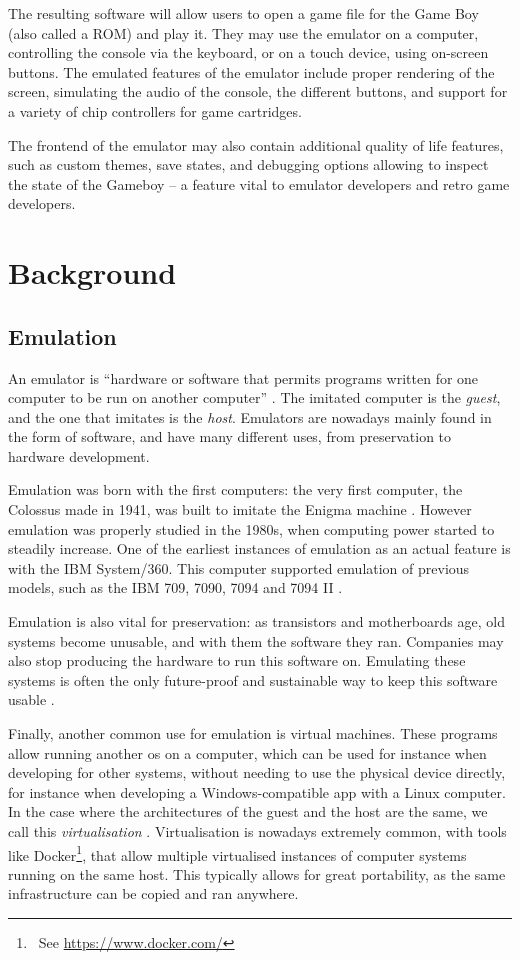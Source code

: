\documentclass[11pt]{informatics-report}
\newcommand{\ftnt}[1]{\footnote{~See \url{#1}}}
\begin{document}
The resulting software will allow users to open a game file for the Game Boy (also called a ROM) and play it. They may use the emulator on a computer, controlling the console via the keyboard, or on a touch device, using on-screen buttons. The emulated features of the emulator include proper rendering of the screen, simulating the audio of the console, the different buttons, and support for a variety of chip controllers for game cartridges.

The frontend of the emulator may also contain additional quality of life features, such as custom themes, save states, and debugging options allowing to inspect the state of the Gameboy -- a feature vital to emulator developers and retro game developers.

\chapter{Background}

\section{Emulation}

An emulator is ``hardware or software that permits programs written for one computer to be run on another computer'' \cite{emulator_def}. The imitated computer is the \textit{guest}, and the one that imitates is the \textit{host}. Emulators are nowadays mainly found in the form of software, and have many different uses, from preservation to hardware development.

Emulation was born with the first computers: the very first computer, the Colossus made in 1941, was built to imitate the Enigma machine \cite{emulator_origin}. However emulation was properly studied in the 1980s, when computing power started to steadily increase. One of the earliest instances of emulation as an actual feature is with the IBM System/360. This computer supported emulation of previous models, such as the IBM 709, 7090, 7094 and 7094 II \cite{ibm_emulation}.

Emulation is also vital for preservation: as transistors and motherboards age, old systems become unusable, and with them the software they ran.  Companies may also stop producing the hardware to run this software on. Emulating these systems is often the only future-proof and sustainable way to keep this software usable \cite{emu_preservation}.

Finally, another common use for emulation is virtual machines. These programs allow running another \gls{os} on a computer, which can be used for instance when developing for other systems, without needing to use the physical device directly, for instance when developing a Windows-compatible app with a Linux computer. In the case where the architectures of the guest and the host are the same, we call this \textit{virtualisation} \cite{emu_vs_virtu}. Virtualisation is nowadays extremely common, with tools like Docker\ftnt{https://www.docker.com/}, that allow multiple virtualised instances of computer systems running on the same host. This typically allows for great portability, as the same infrastructure can be copied and ran anywhere.
\end{document}
